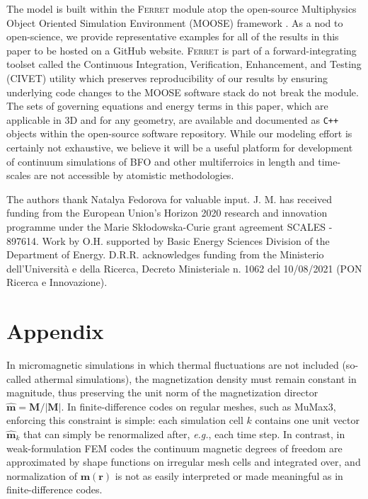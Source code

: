 \documentclass[%
 reprint,
superscriptaddress,
 amsmath,amssymb,
prb,
]{revtex4-1}
\begin{document}
%
The model is built within the \textsc{Ferret} \cite{Mangeri2017} module atop the open-source Multiphysics Object Oriented Simulation Environment (MOOSE) framework \cite{permann2020moose}. 
%
As a nod to open-science, we provide representative examples for all of the results in this paper to be hosted on a GitHub website\cite{FerretLink}.
%
\textsc{Ferret} is part of a forward-integrating toolset called the Continuous Integration, Verification, Enhancement, and Testing (CIVET) \cite{slaughter2021continuous} utility which preserves reproducibility of our results by ensuring underlying code changes to the MOOSE software stack do not break the module.
%
The sets of governing equations and energy terms in this paper, which are applicable in 3D and for any geometry, are available and documented as \texttt{C++} objects within the open-source software repository.
%
While our modeling effort is certainly not exhaustive, we believe it will be a useful platform for development of continuum simulations of BFO and other multiferroics in length and time-scales are not accessible by atomistic methodologies.
%

%
\begin{acknowledgments}
%

%
The authors thank Natalya Fedorova for valuable input. J. M. has received funding from the European Union’s Horizon 2020 research and innovation programme under the Marie Sk\l{}odowska-Curie grant agreement SCALES - 897614. Work by O.H. supported by Basic Energy Sciences Division of the Department of Energy. D.R.R. acknowledges funding from the Ministerio dell'Università e della Ricerca, Decreto Ministeriale n. 1062 del 10/08/2021 (PON Ricerca e Innovazione).

\end{acknowledgments}

\appendix

\section*{Appendix}

In micromagnetic simulations in which thermal fluctuations are not included (so-called athermal simulations), the magnetization density must remain constant in magnitude, thus preserving the unit norm of the magnetization director $\hat{\mathbf m}={\mathbf M}/|{\mathbf M}|$. In finite-difference codes on regular meshes, such as MuMax3\cite{vansteenkiste}, enforcing this constraint is simple: each simulation cell $k$ contains one unit vector $\hat{\mathbf{m}}_k$ that can simply be renormalized after, {\em e.g.}, each time step. In contrast, in weak-formulation FEM codes the continuum magnetic degrees of freedom are approximated by shape functions on irregular mesh cells and integrated over, and normalization of ${\mathbf m}({\mathbf r})$ is not as easily interpreted or made meaningful as in finite-difference codes. 
%
\end{document}
